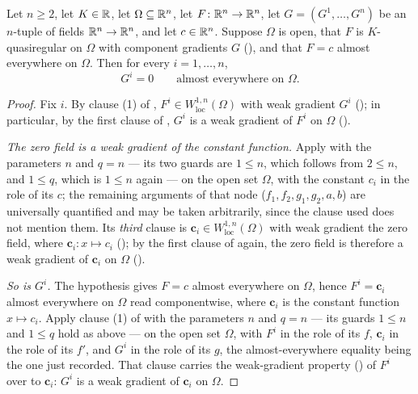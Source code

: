 \begin{lemma}
Let $n\ge2$, let $K\in\mathbb{R}$, let $\Omega\subseteq\mathbb{R}^n$, let
$F\colon\mathbb{R}^n\to\mathbb{R}^n$, let $G=(G^1,\dots,G^n)$ be an $n$-tuple of fields
$\mathbb{R}^n\to\mathbb{R}^n$, and let $c\in\mathbb{R}^n$.  Suppose $\Omega$ is open, that $F$ is
$K$-quasiregular on $\Omega$ with component gradients $G$
(), and that $F=c$ almost everywhere on $\Omega$.  Then for every $i=1,\dots,n$,
\[
G^i=0\qquad\text{almost everywhere on }\Omega .
\]
\end{lemma}
\begin{proof}
Fix $i$.  By clause (1) of ,
$F^i\in W^{1,n}_{\mathrm{loc}}(\Omega)$ with weak gradient $G^i$
(); in particular, by the first clause of
, $G^i$ is a weak gradient of $F^i$ on $\Omega$
().

\emph{The zero field is a weak gradient of the constant function.}  Apply
 with the parameters $n$ and $q=n$ --- its two
guards are $1\le n$, which follows from $2\le n$, and $1\le q$, which is
$1\le n$ again --- on the open set $\Omega$, with the constant $c_i$ in the role
of its $c$; the remaining arguments of that node ($f_1,f_2,g_1,g_2,a,b$) are
universally quantified and may be taken arbitrarily, since the clause used does
not mention them.  Its \emph{third} clause is
$\mathbf c_i\in W^{1,n}_{\mathrm{loc}}(\Omega)$ with weak gradient the zero
field, where $\mathbf c_i\colon x\mapsto c_i$ (); by the
first clause of  again, the zero field is therefore a weak
gradient of $\mathbf c_i$ on $\Omega$ ().

\emph{So is $G^i$.}  The hypothesis gives $F=c$ almost everywhere on $\Omega$,
hence $F^i=\mathbf c_i$ almost everywhere on $\Omega$ read componentwise, where
$\mathbf c_i$ is the constant function $x\mapsto c_i$.  Apply
clause (1) of  with the parameters $n$ and
$q=n$ --- its guards $1\le n$ and $1\le q$ hold as above --- on the open set
$\Omega$, with $F^i$ in the role of its $f$, $\mathbf c_i$ in the role of its
$f'$, and $G^i$ in the role of its $g$, the almost-everywhere equality being the
one just recorded.  That clause carries the weak-gradient property
() of $F^i$ over to $\mathbf c_i$: $G^i$ is a weak
gradient of $\mathbf c_i$ on $\Omega$.


\end{proof}

